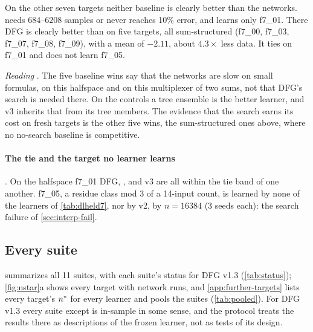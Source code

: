 On the other seven targets neither baseline is clearly better than the networks.  needs 684--6208 samples or never reaches 10\% error, and  learns only f7\_01. There DFG is clearly better than  on five targets, all sum-structured (f7\_00, f7\_03, f7\_07, f7\_08, f7\_09), with a mean of $-2.11$, about $4.3\times$ less data. It ties on f7\_01 and does not learn f7\_05.

\emph{Reading} . The five baseline wins say that the networks are slow on small formulas, on this halfspace and on this multiplexer of two sums, not that DFG's search is needed there. On the controls a tree ensemble is the better learner, and v3 inherits that from its tree members. The evidence that the search earns its cost on fresh targets is the other five wins, the sum-structured ones above, where no no-search baseline is competitive.

\paragraph{The tie and the target no learner learns} . On the halfspace f7\_01 DFG, ,  and v3 are all within the tie band of one another. f7\_05, a residue class mod 3 of a 14-input count, is learned by none of the learners of \cref{tab:dlheld7}, nor by v2, by $n=16384$ (3 seeds each): the search failure of \cref{sec:interp-fail}.

\subsection{Every suite}\label{sec:res-suites}

 summarizes all 11 suites, with each suite's status for DFG v1.3 (\cref{tab:status}); \cref{fig:nstar}a shows every target with network runs, and \cref{app:further-targets} lists every target's $n^{*}$ for every learner and pools the suites (\cref{tab:pooled}). For DFG v1.3 every suite except  is in-sample in some sense, and the protocol treats the results there as descriptions of the frozen learner, not as tests of its design.

